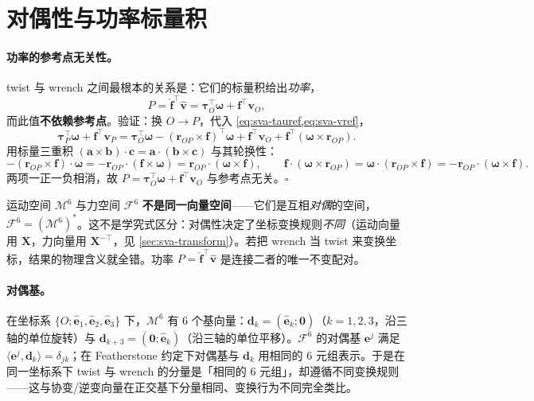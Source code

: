 \section{对偶性与功率标量积}
\label{sec:sva-duality}

\paragraph{功率的参考点无关性。}
twist 与 wrench 之间最根本的关系是：它们的标量积给出\emph{功率}，
\begin{equation}
  P=\hat{\mathbf f}^\top\hat{\mathbf v}=\boldsymbol\tau_O^\top\boldsymbol\omega+\mathbf f^\top\mathbf v_O,
  \label{eq:sva-power}
\end{equation}
而此值\textbf{不依赖参考点}。验证：换 $O\to P$，代入 \cref{eq:sva-tauref,eq:sva-vref}，
\[
  \boldsymbol\tau_P^\top\boldsymbol\omega+\mathbf f^\top\mathbf v_P
  =\boldsymbol\tau_O^\top\boldsymbol\omega-(\mathbf r_{OP}\times\mathbf f)^\top\boldsymbol\omega
   +\mathbf f^\top\mathbf v_O+\mathbf f^\top(\boldsymbol\omega\times\mathbf r_{OP}).
\]
用标量三重积 $(\mathbf a\times\mathbf b)\cdot\mathbf c=\mathbf a\cdot(\mathbf b\times\mathbf c)$ 与其轮换性：
\[
  -(\mathbf r_{OP}\times\mathbf f)\cdot\boldsymbol\omega=-\mathbf r_{OP}\cdot(\mathbf f\times\boldsymbol\omega)
  =\mathbf r_{OP}\cdot(\boldsymbol\omega\times\mathbf f),\qquad
  \mathbf f\cdot(\boldsymbol\omega\times\mathbf r_{OP})=\boldsymbol\omega\cdot(\mathbf r_{OP}\times\mathbf f)=-\mathbf r_{OP}\cdot(\boldsymbol\omega\times\mathbf f).
\]
两项一正一负相消，故 $P=\boldsymbol\tau_O^\top\boldsymbol\omega+\mathbf f^\top\mathbf v_O$ 与参考点无关。$\square$

\begin{insight}
运动空间 $\mathcal M^6$ 与力空间 $\mathcal F^6$ \textbf{不是同一向量空间}——它们是互相\emph{对偶}的空间，$\mathcal F^6=(\mathcal M^6)^*$。这不是学究式区分：对偶性决定了坐标变换规则\emph{不同}（运动向量用 $\mathbf X$，力向量用 $\mathbf X^{-\top}$，见 \cref{sec:sva-transform}）。若把 wrench 当 twist 来变换坐标，结果的物理含义就全错。功率 $P=\hat{\mathbf f}^\top\hat{\mathbf v}$ 是连接二者的唯一不变配对。
\end{insight}

\paragraph{对偶基。}
在坐标系 $\{O;\hat{\mathbf e}_1,\hat{\mathbf e}_2,\hat{\mathbf e}_3\}$ 下，$\mathcal M^6$ 有 6 个基向量：$\mathbf d_k=(\hat{\mathbf e}_k;\mathbf 0)$（$k=1,2,3$，沿三轴的单位旋转）与 $\mathbf d_{k+3}=(\mathbf 0;\hat{\mathbf e}_k)$（沿三轴的单位平移）。$\mathcal F^6$ 的对偶基 $\mathbf e^j$ 满足 $\langle\mathbf e^j,\mathbf d_k\rangle=\delta_{jk}$；在 Featherstone 约定下对偶基与 $\mathbf d_k$ 用相同的 6 元组表示。于是在同一坐标系下 twist 与 wrench 的分量是「相同的 6 元组」，却遵循不同变换规则——这与协变/逆变向量在正交基下分量相同、变换行为不同完全类比。

